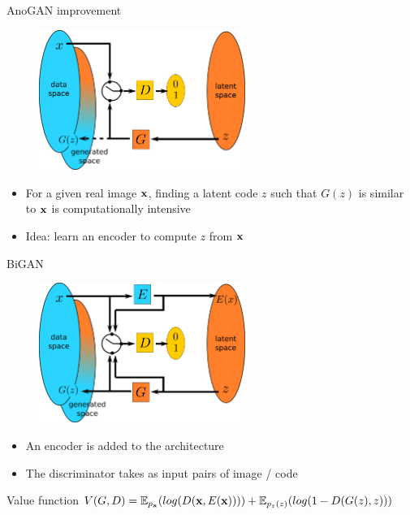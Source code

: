 \documentclass[xcolor=pdftex,dvipsnames,table,mathserif]{beamer}
\begin{document}
\begin{frame}{AnoGAN improvement}

  \begin{figure}[ht]
    \centering
    \includegraphics[width=0.6\textwidth]{gan2}
  \end{figure}

  \begin{itemize}
  \item For a given real image $\mathbf{x}$, finding a latent code $z$ such that $G(z)$ is similar to $\mathbf{x}$ is computationally intensive
  \item Idea: learn an encoder to compute $z$ from $\mathbf{x}$
  \end{itemize}

\end{frame}

\begin{frame}{BiGAN  \cite{donahue_adversarial_2017}}

  \begin{figure}[ht]
    \centering
    \includegraphics[width=0.6\textwidth]{bigan}
  \end{figure}

  \begin{itemize}
  \item An encoder is added to the architecture
  \item The discriminator takes as input pairs of image / code
  \end{itemize}

    \begin{block}{Value function}
    $V(G,D) = \mathbb{E}_{p_{\mathbf{x}}}(log(D(\mathbf{x}, E(\mathbf{x})))) + \mathbb{E}_{p_z(z)}(log(1 - D(G(z), z)))$
  \end{block}


\end{frame}
\end{document}
